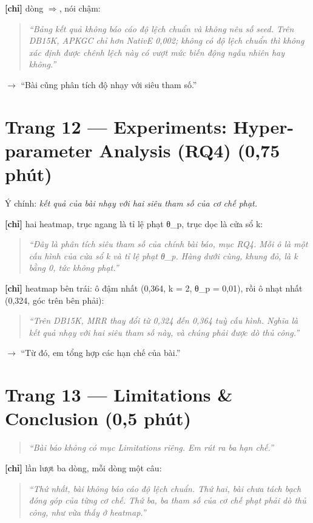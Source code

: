 \documentclass[11pt,a4paper]{article}
\begin{document}
\textbf{[chỉ]} dòng \ensuremath{\Rightarrow}, nói chậm:


\begin{quote}\itshape ``Bảng kết quả không báo cáo \emph{độ lệch chuẩn} và không nêu số seed. Trên DB15K, APKGC chỉ hơn NativE 0,002; không có độ lệch chuẩn thì không xác định được chênh lệch này có vượt mức biến động ngẫu nhiên hay không.''\end{quote}

\textbf{$\to$} ``Bài cũng phân tích độ nhạy với siêu tham số.''


\section*{Trang 12 --- Experiments: Hyper-parameter Analysis (RQ4) (0,75 phút)}

Ý chính: \emph{kết quả của bài nhạy với hai siêu tham số của cơ chế phạt.}


\textbf{[chỉ]} hai heatmap, trục ngang là tỉ lệ phạt θ\_p, trục dọc là cửa sổ k:


\begin{quote}\itshape ``Đây là phân tích siêu tham số của chính bài báo, mục RQ4. Mỗi ô là một cấu hình của cửa sổ k và tỉ lệ phạt θ\_p. Hàng dưới cùng, khung đỏ, là k bằng 0, tức không phạt.''\end{quote}

\textbf{[chỉ]} heatmap bên trái: ô đậm nhất (0,364, k = 2, θ\_p = 0,01), rồi ô nhạt nhất (0,324, góc trên bên phải):


\begin{quote}\itshape ``Trên DB15K, MRR thay đổi từ 0,324 đến 0,364 tuỳ cấu hình. Nghĩa là kết quả nhạy với hai siêu tham số này, và chúng phải được dò thủ công.''\end{quote}

\textbf{$\to$} ``Từ đó, em tổng hợp các hạn chế của bài.''


\section*{Trang 13 --- Limitations \& Conclusion (0,5 phút)}

\begin{quote}\itshape ``Bài báo không có mục Limitations riêng. Em rút ra ba hạn chế.''\end{quote}

\textbf{[chỉ]} lần lượt ba dòng, mỗi dòng một câu:


\begin{quote}\itshape ``Thứ nhất, bài không báo cáo độ lệch chuẩn. Thứ hai, bài chưa tách bạch đóng góp của từng cơ chế. Thứ ba, ba tham số của cơ chế phạt phải dò thủ công, như vừa thấy ở heatmap.''\end{quote}
\end{document}
